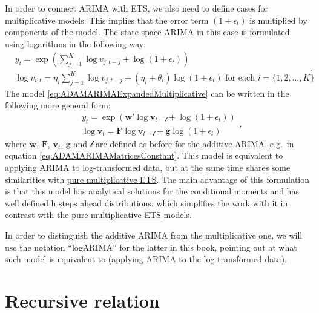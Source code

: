 \documentclass[
]{book}
\theoremstyle{definition}
\theoremstyle{definition}
\theoremstyle{definition}
\theoremstyle{definition}
\theoremstyle{remark}
\begin{document}
In order to connect ARIMA with ETS, we also need to define cases for multiplicative models. This implies that the error term \((1+\epsilon_t)\) is multiplied by components of the model. The state space ARIMA in this case is formulated using logarithms in the following way:
\begin{equation}
  \begin{aligned}
    &{y}_{t} = \exp \left( \sum_{j=1}^K \log v_{j,t-j} + \log(1+\epsilon_t) \right) \\
    &\log v_{i,t} = \eta_i \sum_{j=1}^K \log v_{j,t-j} + (\eta_i + \theta_i) \log(1+\epsilon_t) \text{ for each } i=\{1, 2, \dots, K \}
  \end{aligned}.
  \label{eq:ADAMARIMAExpandedMultiplicative}
\end{equation}
The model \eqref{eq:ADAMARIMAExpandedMultiplicative} can be written in the following more general form:
\begin{equation}
  \begin{aligned}
    &{y}_{t} = \exp \left( \mathbf{w}' \log \mathbf{v}_{t-\boldsymbol{\mathscr{l}}} + \log(1+\epsilon_t) \right) \\
    &\log \mathbf{v}_{t} = \mathbf{F} \log \mathbf{v}_{t-\boldsymbol{\mathscr{l}}} + \mathbf{g} \log(1+\epsilon_t)
  \end{aligned},
  \label{eq:ADAMStateSpaceMultiplicative}
\end{equation}
where \(\mathbf{w}\), \(\mathbf{F}\), \(\mathbf{v}_t\), \(\mathbf{g}\) and \(\boldsymbol{\mathscr{l}}\) are defined as before for the \protect\hyperlink{StateSpaceARIMA}{additive ARIMA}, e.g.~in equation \eqref{eq:ADAMARIMAMatricesConstant}. This model is equivalent to applying ARIMA to log-transformed data, but at the same time shares some similarities with \protect\hyperlink{ADAMETSPureMultiplicative}{pure multiplicative ETS}. The main advantage of this formulation is that this model has analytical solutions for the conditional moments and has well defined h steps ahead distributions, which simplifies the work with it in contrast with the \protect\hyperlink{ADAMETSPureMultiplicative}{pure multiplicative ETS} models.

In order to distinguish the additive ARIMA from the multiplicative one, we will use the notation ``logARIMA'' for the latter in this book, pointing out at what such model is equivalent to (applying ARIMA to the log-transformed data).

\hypertarget{ADAMARIMARecursive}{%
\section{Recursive relation}\label{ADAMARIMARecursive}}
\end{document}
